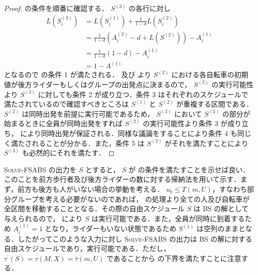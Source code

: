 \begin{proof}
   の条件を順番に確認する． $S^{(3)}$ の各行に対し
  \begin{align}
    L(S^{(3)}_i) &= L(S^{(1)}_i) + \frac{1}{1 - d}L(S^{(2)}_i) \\
                 &= \frac{1}{1 - d}(A^{(2)}_i - d + L(S^{(2)})) - A^{(1)}_i \\
                 &= \frac{1}{1 - d}(1 - d) - A^{(1)}_i \\
                 &= 1 - A^{(1)}
  \end{align}
  となるので  の条件 1 が満たされる．  及び  より $S^{(2)}$ における各自転車の初期値が後方ライダーもしくはグループの出発点に決まるので， $S^{(2)}$ の実行可能性より $S^{(3)}$ に対しても条件 2 が成り立つ．条件 3 はそれぞれのスケジュールで満たされているので確認すべきところは $S^{(1)}$ と $S^{(2)}$ が重複する区間である． $S^{(2)}$ は同時出発を前提に実行可能であるため， $S^{(3)}$ において $S^{(2)}$ の部分が始まるときに全員が同時出発をすれば $S^{(2)}$ の実行可能性より条件 3 が成り立ち，  により同時出発が保証される．同様な議論をすることにより条件 4 も同じく満たされることが分かる．また，条件 5 は $S^{(2)}$ がそれを満たすことにより $S^{(3)}$ も必然的にそれを満たす．
\end{proof}

\textsc{Solve-FSABS} の出力を $S$ とすると， $S$ が  の条件を満たすことを示せば良い．このことを前方歩行者及び後方ライダーの数に対する帰納法を用いて示す．まず，前方も後方も人がいない場合の挙動を考える． $u_b \leq T(m, U)$，すなわち部分グループを考える必要がないのであれば，  の処理より全ての人及び自転車が全区間を移動することとなる．その際の自由スケジュール $S$ は BS の解として与えられるので，  により $S$ は実行可能である．また，全員が同時に到着するため $A^{(1)}_i = 1$ となり，ライダーもいない状態であるため $S^{(1)}$ は空列のままとなる．したがってこのような入力に対し \textsc{Solve-FSABS} の出力は BS の解に対する自由スケジュールであり，実行可能である．ただし， $\tau^\prime(S) = \tau(M, X) = \bar\tau(m, U)$ であることから  の下界を満たすことに注意する．


